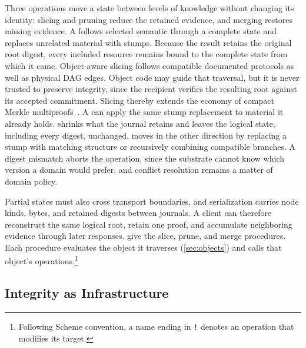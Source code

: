 Three operations move a state between levels of knowledge without changing its identity: slicing and pruning reduce the retained evidence, and merging restores missing evidence. A  follows selected semantic  through a complete state and replaces unrelated material with stumps. Because the result retains the original root digest, every included resource remains bound to the complete state from which it came. Object-aware slicing follows compatible documented protocols as well as physical DAG edges. Object code may guide that traversal, but it is never trusted to preserve integrity, since the recipient verifies the resulting root against its accepted commitment. Slicing thereby extends the economy of compact Merkle multiproofs~\cite{Ramabaja2020compact}. A  can apply the same stump replacement to material it already holds.  shrinks what the journal retains and leaves the logical state, including every digest, unchanged.  moves in the other direction by replacing a stump with matching structure or recursively combining compatible branches. A digest mismatch aborts the operation, since the substrate cannot know which version a domain would prefer, and conflict resolution remains a matter of domain policy.

Partial states must also cross transport boundaries, and serialization carries node kinds, bytes, and retained digests between journals. A client can therefore reconstruct the same logical root, retain one proof, and accumulate neighboring evidence through later responses.  give the slice, prune, and merge procedures. Each procedure evaluates the object it traverses (\cref{sec:objects}) and calls that object's operations.\footnote{Following Scheme convention, a name ending in \texttt{!} denotes an operation that modifies its target.}







\subsection{Integrity as Infrastructure}

